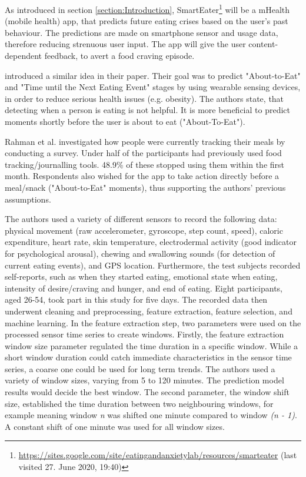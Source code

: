 
As introduced in section \ref{section:Introduction}, SmartEater\footnote{\url{https://sites.google.com/site/eatingandanxietylab/resources/smarteater} (last visited 27. June 2020, 19:40)} will be a mHealth (mobile health) app, that predicts future eating crises based on the user's past behaviour. The predictions are made on smartphone sensor and usage data, therefore reducing strenuous user input. The app will give the user content-dependent feedback, to avert a food craving episode. 

\textcite{AboutToEat2016Rahman} introduced a similar idea in their paper. Their goal was to predict "About-to-Eat" and "Time until the Next Eating Event" stages by using wearable sensing devices, in order to reduce serious health issues (e.g. obesity). The authors state, that detecting when a person is eating is not helpful. It is more beneficial to predict moments shortly before the user is about to eat ("About-To-Eat").

Rahman et al. investigated how people were currently tracking their meals by conducting a survey. Under half of the participants had previously used food tracking/journalling tools. 48.9\% of these stopped using them within the first month. Respondents also  wished for the app to take action directly before a meal/snack ("About-to-Eat" moments), thus supporting the authors' previous assumptions.

The authors used a variety of different sensors to record the following data: physical movement (raw accelerometer, gyroscope, step count, speed), caloric expenditure, heart rate, skin temperature, electrodermal activity (good indicator for psychological arousal), chewing and swallowing sounds (for detection of current eating events), and GPS location. Furthermore, the test subjects recorded self-reports, such as when they started eating, emotional state when eating, intensity of desire/craving and hunger, and end of eating. Eight participants, aged 26-54, took part in this study for five days. The recorded data then underwent cleaning and preprocessing, feature extraction, feature selection, and machine learning. 
In the feature extraction step, two parameters were used on the processed sensor time series to create windows. Firstly, the feature extraction window size parameter regulated the time duration in a specific window. While a short window duration could catch immediate characteristics in the sensor time series, a coarse one could be used for long term trends. The authors used a variety of window sizes, varying from 5 to 120 minutes. The prediction model results would decide the best window. The second parameter, the window shift size, established the time duration between two neighbouring windows, for example meaning window \textit{n} was shifted one minute compared to window \textit{(n - 1)}. A constant shift of one minute was used for all window sizes. 

